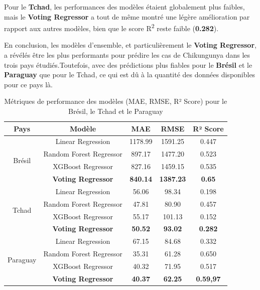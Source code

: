 Pour le \textbf{Tchad}, les performances des modèles étaient globalement plus faibles, mais le \textbf{Voting Regressor} a tout de même montré une légère amélioration par rapport aux autres modèles, bien que le score R\textsuperscript{2} reste faible (\textbf{0.282}).

En conclusion, les modèles d'ensemble, et particulièrement le \textbf{Voting Regressor}, a révélés être les plus performants pour prédire les cas de Chikungunya dans les trois pays étudiés.Toutefois, avec des prédictions plus fiables pour le \textbf{Brésil} et le \textbf{Paraguay} que pour le Tchad, ce qui est dû à la quantité des données disponibles pour ce pays là.

\begin{table}[h!]
	\centering
	\caption{Métriques de performance des modèles (MAE, RMSE, R² Score) pour le Brésil, le Tchad et le Paraguay}
	\begin{tabular}{|c|c|c|c|c|}
		
		\hline
		\textbf{Pays} & \textbf{Modèle} & \textbf{MAE} & \textbf{RMSE} & \textbf{R² Score} \\ 
		\hline
		\multirow{4}{*}{Brésil} & Linear Regression & 1178.99 & 1591.25 & 0.447 \\ 
		& Random Forest Regressor & 897.17  & 1477.20 & 0.523 \\ 
		& XGBoost Regressor & 827.16  & 1459.15 & 0.535 \\ 
		& \textbf{Voting Regressor} & \textbf{840.14}  & \textbf{1387.23} & \textbf{0.65} \\ 
		\hline
		\multirow{4}{*}{Tchad}  & Linear Regression & 56.06   & 98.34   & 0.198 \\ 
		& Random Forest Regressor & 47.81   & 80.90   & 0.457 \\ 
		& XGBoost Regressor & 55.17   & 101.13  & 0.152 \\ 
		& \textbf{Voting Regressor} & \textbf{50.52}   & \textbf{93.02}   & \textbf{0.282} \\ 
		\hline
		\multirow{4}{*}{Paraguay} & Linear Regression & 67.15   & 84.68   & 0.332 \\ 
		& Random Forest Regressor & 35.31   & 61.28   & 0.650 \\ 
		& XGBoost Regressor & 40.32   & 71.95   & 0.517 \\ 
		& \textbf{Voting Regressor} & \textbf{40.37}   & \textbf{62.25}   & \textbf{0.59,97} \\ 
		\hline
	\end{tabular}
	
\end{table}

